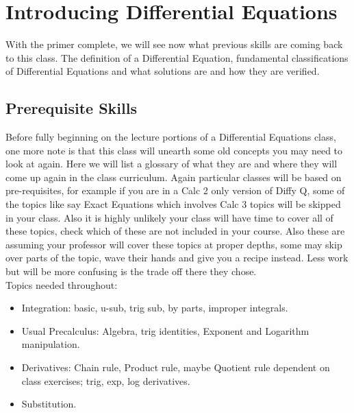 \documentclass[12pt]{article}
\begin{document}
\pagebreak

\section{Introducing Differential Equations}

With the primer complete, we will see now what previous skills are coming back to this class. The definition of a Differential Equation, fundamental classifications of Differential Equations and what solutions are and how they are verified.

\subsection{Prerequisite Skills}

Before fully beginning on the lecture portions of a Differential Equations class, one more note is that this class will unearth some old concepts you may need to look at again. Here we will list a glossary of what they are and where they will come up again in the class curriculum. Again particular classes will be based on pre-requisites, for example if you are in a Calc 2 only version of Diffy Q, some of the topics like say Exact Equations which involves Calc 3 topics will be skipped in your class. Also it is highly unlikely your class will have time to cover all of these topics, check which of these are not included in your course. Also these are assuming your professor will cover these topics at proper depths, some may skip over parts of the topic, wave their hands and give you a recipe instead. Less work but will be more confusing is the trade off there they chose. \\

Topics needed throughout:

\begin{itemize}
    \item Integration: basic, u-sub, trig sub, by parts, improper integrals. 
    \item Usual Precalculus: Algebra, trig identities, Exponent and Logarithm manipulation.
    \item Derivatives: Chain rule, Product rule, maybe Quotient rule dependent on class exercises; trig, exp, log derivatives.
    \item Substitution.
\end{itemize}
\end{document}
